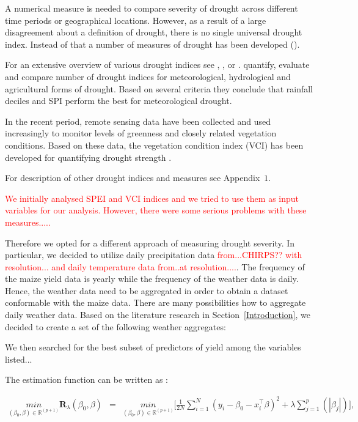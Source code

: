 \documentclass[a4paper,12pt]{article}
\begin{document}
A numerical measure is needed to compare severity of drought across different time periods or geographical locations. However, as a result of a large disagreement about a definition of drought, there is no single universal drought index. Instead of that a number of measures of drought has been developed (\citealp{Heim2002, wilhite1985, wilhite2000}).


For an extensive overview of various drought indices see \cite{Heim2002}, \cite{monacelli2005}, \cite{svoboda2016} or \cite{zargar2011}. \cite{keyantash2002} quantify, evaluate and compare number of drought indices for meteorological, hydrological and agricultural forms of drought. Based on several criteria they conclude that rainfall deciles and SPI perform the best for meteorological drought.

In the recent period, remote sensing data have been collected and used increasingly to monitor levels of greenness and closely related vegetation conditions. Based on these data, the vegetation condition index (VCI) has been developed for quantifying drought strength \citep{KlischAtz2016}.


For description of other drought indices and measures see Appendix~$1$.

\textcolor{red}{We initially analysed SPEI and VCI indices and we tried to use them as input variables for our analysis. However, there were some serious problems with these measures.....}

Therefore we opted for a different approach of measuring drought severity. In particular, we decided to utilize daily precipitation data \textcolor{red}{from...CHIRPS?? with resolution... and daily temperature data from..at resolution....}. The frequency  of the maize yield data is yearly while the frequency of the weather data is daily. Hence, the weather data need to be aggregated in order to obtain a dataset conformable with the maize data. There are many possibilities how to aggregate daily weather data. Based on the literature research in Section~\ref{Introduction}, we decided to create a set of the following weather aggregates:

We then searched for the best subset of predictors of yield among the variables listed... 




\sloppy
The estimation function can be written as \citep{Friedman2010}:


\begin{equation}\label{Lasso}
\begin{array}{lcll}

 \underset{(\beta_0, \beta) \in \mathbb{R}^{(p+1)}}{min} \boldsymbol{R}_{\lambda}(\beta_0, \beta)&=&
   \underset{(\beta_0, \beta) \in \mathbb{R}^{(p+1)}}{min} \bigg[ \frac{1}{2N}\sum_{i=1}^{N}(y_i - \beta_0-x_i^{\intercal}\beta)^2 + \lambda\sum_{j=1}^{p}(|\beta_j|) \bigg], \\
\end{array}
\end{equation}
\end{document}
